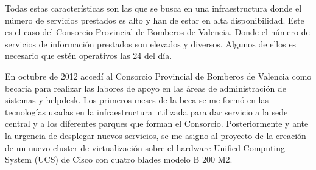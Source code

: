\documentclass[12pt,a4paper,titlepage,twoside]{report}
\begin{document}
\par 
Todas estas características son las que se busca en una infraestructura donde el número de servicios prestados es alto y han de estar en alta disponibilidad. Este es el caso del Consorcio Provincial de Bomberos de Valencia. Donde el número de servicios de información prestados son elevados y diversos. Algunos de ellos es necesario que estén operativos las 24 del día. 
\par
En octubre de 2012 accedí al Consorcio Provincial de Bomberos de Valencia como becaria para realizar las labores de apoyo en las áreas de administración de sistemas y helpdesk. Los primeros meses de la beca se me formó en las tecnologías usadas en la infraestructura utilizada para dar servicio a la sede central y a los diferentes parques que forman el Consorcio. Posteriormente y ante la urgencia de desplegar nuevos servicios, se me asigno al proyecto de la creación de un nuevo cluster de virtualización sobre el hardware Unified Computing System (UCS) de Cisco con cuatro blades modelo B 200 M2.
\end{document}
